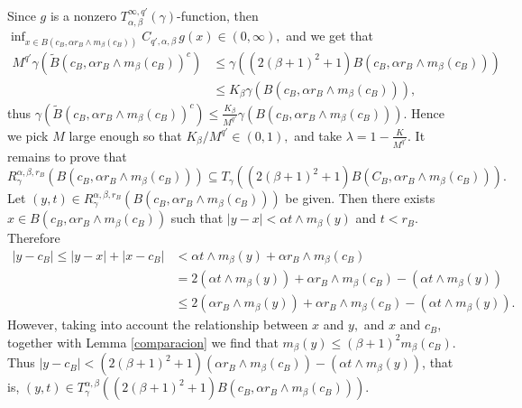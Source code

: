 \documentclass[leqno,11pt]{amsart}
\theoremstyle{plain}
\theoremstyle{remark}
\begin{document}
{{Since $g$ is a nonzero $T^{\infty,q'}_{\alpha,\beta} (\gamma)$-function, then $\inf_{x\in B(c_B, \alpha r_B\wedge m_\beta (c_B))} C_{q',\alpha,\beta}\, g(x)\in (0,\infty),$ and we get that 
\begin{align*}
M^{q'} \gamma(\widetilde{B}(c_B, \alpha r_B\wedge m_\beta (c_B))^c)&\le \gamma((2(\beta+1)^2+1)B(c_B, \alpha r_B\wedge m_\beta (c_B))) \\ & \le K_\beta \gamma (B(c_B, \alpha r_B \wedge m_\beta (c_B))),
\end{align*}
thus $\gamma (\widetilde{B}(c_B, \alpha r_B\wedge m_\beta (c_B))^c)\le \frac{K_\beta}{M^{q'}}\gamma (B(c_B, \alpha r_B\wedge m_\beta (c_B))).$ Hence we pick $M$ large enough so that $K_\beta /M^{q'}\in (0,1),$ and take $\lambda= 1-\frac{K}{M^{q'}}.$ 
It remains to prove that $$R_{\gamma}^{\alpha, \beta, r_B}(B(c_B, \alpha r_B \wedge m_\beta (c_B)))\subseteq T_\gamma ((2(\beta+1)^2+1)B(C_B, \alpha r_B\wedge m_\beta (c_B))).$$ Let $(y,t)\in R_{\gamma}^{\alpha, \beta, r_B}(B(c_B, \alpha r_B\wedge m_\beta (c_B)))$ be given. Then there exists $x\in B(c_B, \alpha r_B \wedge m_\beta (c_B))$ such that $|y-x|<\alpha t\wedge m_\beta (y)$ and $t<r_B.$ Therefore \begin{align*}|y-c_B|\le |y-x|+|x-c_B|& <\alpha t\wedge m_\beta (y)+ \alpha r_B\wedge m_\beta (c_B)\\ &=2(\alpha t\wedge m_\beta(y))+\alpha r_B\wedge m_\beta(c_B)-(\alpha t\wedge m_\beta (y))\\ &\le 2(\alpha r_B\wedge m_\beta (y))+ \alpha r_B\wedge m_\beta (c_B)- (\alpha t\wedge m_\beta (y)).
\end{align*}
However, taking into account the relationship between $x$ and $y,$ and $x$ and $c_B,$ together with Lemma \ref{comparacion} we find that $m_\beta (y)\le (\beta+1)^2 m_\beta (c_B).$ Thus $|y-c_B|< (2(\beta+1)^2+1) (\alpha r_B\wedge m_\beta (c_B))-(\alpha t\wedge m_\beta (y))$, that is, $(y,t)\in T_\gamma^{\alpha, \beta} ((2(\beta+1)^2+1)B(c_B, \alpha r_B\wedge m_\beta (c_B))).$ }

 

}
\end{document}
